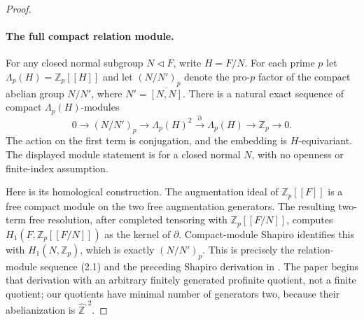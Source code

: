 \begin{proof}
\paragraph{The full compact relation module.}
For any closed normal subgroup $N\triangleleft F$, write $H=F/N$.
For each prime $p$ let $\Lambda_p(H)=\mathbb Z_p[[H]]$ and let
$(N/N')_p$ denote the pro-$p$ factor of the compact abelian group
$N/N'$, where $N'=\overline{[N,N]}$.
There is a natural exact sequence of compact $\Lambda_p(H)$-modules
\[
 0\longrightarrow (N/N')_p
 \longrightarrow \Lambda_p(H)^2
 \xrightarrow{\partial}\Lambda_p(H)
 \longrightarrow\mathbb Z_p\longrightarrow0.          \tag{C.48.3}
\]
The action on the first term is conjugation, and the embedding is
$H$-equivariant. The displayed module statement is for a closed
normal $N$, with no openness or finite-index assumption.

Here is its homological construction. The augmentation ideal of
$\mathbb Z_p[[F]]$ is a free compact module on the two free
augmentation generators. The resulting two-term free resolution,
after completed tensoring with $\mathbb Z_p[[F/N]]$, computes
$H_1(F,\mathbb Z_p[[F/N]])$ as the kernel of $\partial$.
Compact-module Shapiro identifies this with $H_1(N,\mathbb Z_p)$,
which is exactly $(N/N')_p$.
This is precisely the relation-module sequence (2.1) and the
preceding Shapiro derivation in
\cite[\S2.2, displayed (2.1), preprint p.~13]{PBC_GJPPZ2014}.
The paper begins that derivation with an arbitrary finitely generated
profinite quotient, not a finite quotient; our quotients have minimal
number of generators two, because their abelianization is
$\widehat{\mathbb Z}^{,2}$.


\end{proof}
